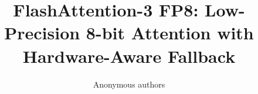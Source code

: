 \title{\textbf{FlashAttention-3 FP8: Low-Precision 8-bit Attention with Hardware-Aware Fallback}}

\author{Anonymous authors}
